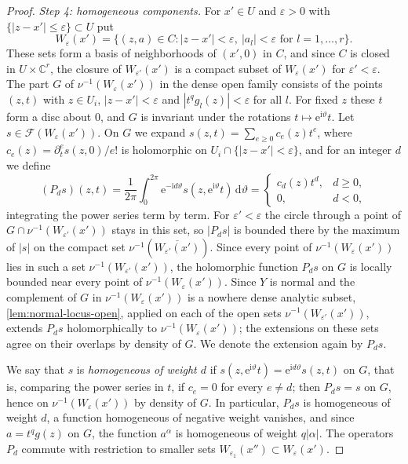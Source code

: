 \begin{proof}
\emph{Step 4: homogeneous components.} For $x'\in U$ and $\varepsilon>0$ with $\{|z-x'|\leq\varepsilon\}\subset U$ put
\[
 W_\varepsilon(x')=\{(z,a)\in C:|z-x'|<\varepsilon,\ |a_l|<\varepsilon\text{ for }l=1,\ldots,r\}.
\]
These sets form a basis of neighborhoods of $(x',0)$ in $C$, and since $C$ is closed in $U\times\mathbb C^r$, the closure of $W_{\varepsilon'}(x')$ is a compact subset of $W_\varepsilon(x')$ for $\varepsilon'<\varepsilon$. The part $G$ of $\nu^{-1}(W_\varepsilon(x'))$ in the dense open family consists of the points $(z,t)$ with $z\in U_i$, $|z-x'|<\varepsilon$ and $|t^qg_l(z)|<\varepsilon$ for all $l$. For fixed $z$ these $t$ form a disc about $0$, and $G$ is invariant under the rotations $t\mapsto\mathrm e^{\mathrm i\vartheta}t$. Let $s\in\mathcal F(W_\varepsilon(x'))$. On $G$ we expand $s(z,t)=\sum_{e\geq0}c_e(z)t^e$, where $c_e(z)=\partial_t^es(z,0)/e!$ is holomorphic on $U_i\cap\{|z-x'|<\varepsilon\}$, and for an integer $d$ we define
\[
 (P_ds)(z,t)=\frac1{2\pi}\int_0^{2\pi}
         \mathrm e^{-\mathrm id\vartheta}
         s(z,\mathrm e^{\mathrm i\vartheta}t)\,\mathrm d\vartheta
 =\begin{cases}c_d(z)t^d,&d\geq0,\\0,&d<0,\end{cases}
\]
integrating the power series term by term. For $\varepsilon'<\varepsilon$ the circle through a point of $G\cap\nu^{-1}(W_{\varepsilon'}(x'))$ stays in this set, so $|P_ds|$ is bounded there by the maximum of $|s|$ on the compact set $\nu^{-1}(\overline{W_{\varepsilon'}(x')})$. Since every point of $\nu^{-1}(W_\varepsilon(x'))$ lies in such a set $\nu^{-1}(W_{\varepsilon'}(x'))$, the holomorphic function $P_ds$ on $G$ is locally bounded near every point of $\nu^{-1}(W_\varepsilon(x'))$. Since $Y$ is normal and the complement of $G$ in $\nu^{-1}(W_\varepsilon(x'))$ is a nowhere dense analytic subset, \cref{lem:normal-locus-open}, applied on each of the open sets $\nu^{-1}(W_{\varepsilon'}(x'))$, extends $P_ds$ holomorphically to $\nu^{-1}(W_\varepsilon(x'))$; the extensions on these sets agree on their overlaps by density of $G$. We denote the extension again by $P_ds$.

We say that $s$ is \emph{homogeneous of weight $d$} if $s(z,\mathrm e^{\mathrm i\vartheta}t)=\mathrm e^{\mathrm id\vartheta}s(z,t)$ on $G$, that is, comparing the power series in $t$, if $c_e=0$ for every $e\neq d$; then $P_ds=s$ on $G$, hence on $\nu^{-1}(W_\varepsilon(x'))$ by density of $G$. In particular, $P_ds$ is homogeneous of weight $d$, a function homogeneous of negative weight vanishes, and since $a=t^qg(z)$ on $G$, the function $a^\alpha$ is homogeneous of weight $q|\alpha|$. The operators $P_d$ commute with restriction to smaller sets $W_{\varepsilon_1}(x'')\subset W_\varepsilon(x')$.


\end{proof}

